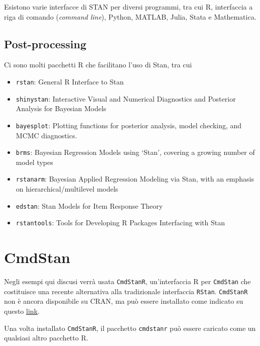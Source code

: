 \documentclass[
]{memoir}
\providecommand{\tightlist}{%
  \setlength{\itemsep}{0pt}\setlength{\parskip}{0pt}}
\begin{document}
Esistono varie interfacce di STAN per diversi programmi, tra cui R, interfaccia a riga di comando (\emph{command line}), Python, MATLAB, Julia, Stata e Mathematica.

\hypertarget{post-processing}{%
\subsection{Post-processing}\label{post-processing}}

Ci sono molti pacchetti R che facilitano l'uso di Stan, tra cui

\begin{itemize}
\tightlist
\item
  \texttt{rstan}: General R Interface to Stan
\item
  \texttt{shinystan}: Interactive Visual and Numerical Diagnostics and Posterior Analysis for Bayesian Models
\item
  \texttt{bayesplot}: Plotting functions for posterior analysis, model checking, and MCMC diagnostics.
\item
  \texttt{brms}: Bayesian Regression Models using `Stan', covering a growing number of model types
\item
  \texttt{rstanarm}: Bayesian Applied Regression Modeling via Stan, with an emphasis on hierarchical/multilevel models
\item
  \texttt{edstan}: Stan Models for Item Response Theory
\item
  \texttt{rstantools}: Tools for Developing R Packages Interfacing with Stan
\end{itemize}

\hypertarget{cmdstan}{%
\section{CmdStan}\label{cmdstan}}

Negli esempi qui discusi verrà usata \texttt{CmdStanR}, un'interfaccia R per \texttt{CmdStan} che costituisce una recente alternativa alla tradizionale interfaccia \texttt{RStan}. \texttt{CmdStanR} non è ancora disponibile su CRAN, ma può essere installato come indicato su questo \href{https://mc-stan.org/docs/2_27/cmdstan-guide/cmdstan-installation.html}{link}.

Una volta installato \texttt{CmdStanR}, il pacchetto \texttt{cmdstanr} può essere caricato come un qualsiasi altro pacchetto R.
\end{document}
